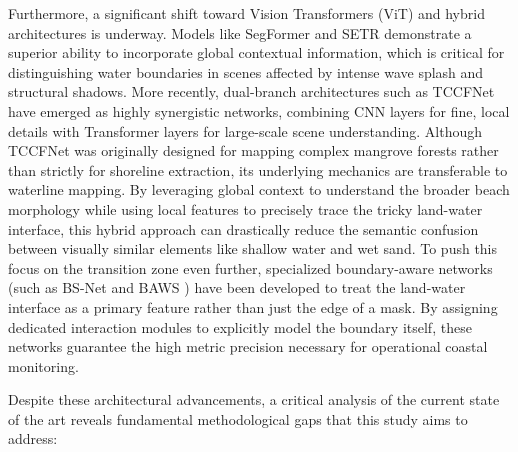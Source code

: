 ﻿\documentclass[ENG]{TFUOC}%
\begin{document}
Furthermore, a significant shift toward Vision Transformers (ViT) and hybrid architectures is underway. Models like SegFormer \citep{xie_segformer_2021} and SETR \citep{zheng_rethinking_2020} demonstrate a superior ability to incorporate global contextual information, which is critical for distinguishing water boundaries in scenes affected by intense wave splash and structural shadows. More recently, dual-branch architectures such as TCCFNet \citep{fu_tccfnet_2025} have emerged as highly synergistic networks, combining CNN layers for fine, local details with Transformer layers for large-scale scene understanding. Although TCCFNet was originally designed for mapping complex mangrove forests rather than strictly for shoreline extraction, its underlying mechanics are transferable to waterline mapping. By leveraging global context to understand the broader beach morphology while using local features to precisely trace the tricky land-water interface, this hybrid approach can drastically reduce the semantic confusion between visually similar elements like shallow water and wet sand. To push this focus on the transition zone even further, specialized boundary-aware networks (such as BS-Net \citep{jing_bs-net_2021} and BAWS \citep{zhan_usv-seg_2025}) have been developed to treat the land-water interface as a primary feature rather than just the edge of a mask. By assigning dedicated interaction modules to explicitly model the boundary itself, these networks guarantee the high metric precision necessary for operational coastal monitoring.

Despite these architectural advancements, a critical analysis of the current state of the art reveals fundamental methodological gaps that this study aims to address:
\end{document}

